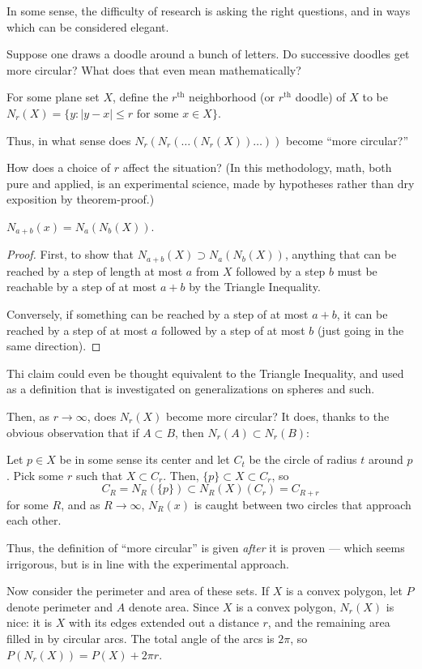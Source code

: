 In some sense, the difficulty of research is asking the right questions, and in ways which can be considered elegant.

Suppose one draws a doodle around a bunch of letters. Do successive doodles get more circular? What does that even mean mathematically?
\begin{defn}
For some plane set $X$, define the $r^{\mathrm{th}}$ neighborhood (or $r^{\mathrm{th}}$ doodle) of $X$ to be $N_r(X) = \{y:|y-x|\le r\text{ for some }x\in X\}$.
\end{defn}
Thus, in what sense does $N_r(N_r(\dots(N_r(X))\dots))$ become ``more circular?''

How does a choice of $r$ affect the situation? (In this methodology, math, both pure and applied, is an experimental science, made by hypotheses rather than dry exposition by theorem-proof.)
\begin{claim}
$N_{a+b}(x) = N_a(N_b(X))$.
\end{claim}
\begin{proof}
First, to show that $N_{a+b}(X) \supset N_a(N_b(X))$, anything that can be reached by a step of length at most $a$ from $X$ followed by a step $b$ must be reachable by a step of at most $a+b$ by the Triangle Inequality.

Conversely, if something can be reached by a step of at most $a+b$, it can be reached by a step of at most $a$ followed by a step of at most $b$ (just going in the same direction).
\end{proof}
Thi claim could even be thought equivalent to the Triangle Inequality, and used as a definition that is investigated on generalizations on spheres and such.

Then, as $r\to\infty$, does $N_r(X)$ become more circular? It does, thanks to the obvious observation that if $A\subset B$, then $N_r(A) \subset N_r(B)$:

Let $p\in X$ be in some sense its center and let $C_t$ be the circle of radius $t$ around $p$. Pick some $r$ such that $X\subset C_r$. Then, $\{p\}\subset X\subset C_r$, so
\[C_R = N_R(\{p\})\subset N_R(X)(C_r) = C_{R+r}\]
for some $R$, and as $R\to\infty$, $N_R(x)$ is caught between two circles that approach each other.

Thus, the definition of ``more circular'' is given \emph{after} it is proven --- which seems irrigorous, but is in line with the experimental approach.

Now consider the perimeter and area of these sets. If $X$ is a convex polygon, let $P$ denote perimeter and $A$ denote area. Since $X$ is a convex polygon, $N_r(X)$ is nice: it is $X$ with its edges extended out a distance $r$, and the remaining area filled in by circular arcs. The total angle of the arcs is $2\pi$, so $P(N_r(X)) = P(X) +2\pi r$.

